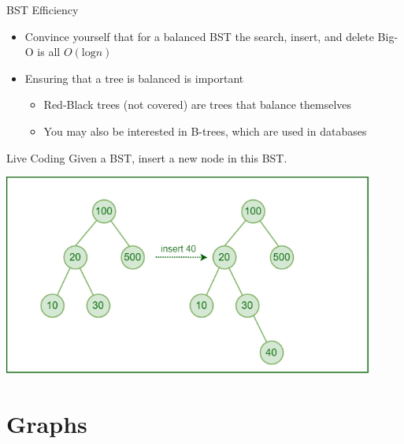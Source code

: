 \documentclass[
  ignorenonframetext,
]{beamer}
\begin{document}
\begin{frame}{BST Efficiency}
\protect\hypertarget{bst-efficiency-1}{}
\begin{itemize}
\item
  Convince yourself that for a balanced BST the search, insert, and
  delete Big-O is all \(O(\text{log}n)\)
\item
  Ensuring that a tree is balanced is important

  \begin{itemize}
  \item
    Red-Black trees (not covered) are trees that balance themselves
  \item
    You may also be interested in B-trees, which are used in databases
  \end{itemize}
\end{itemize}
\end{frame}

\begin{frame}{Live Coding}
\protect\hypertarget{live-coding}{}
Given a BST, insert a new node in this BST.

\includegraphics[width=4.80208in,height=\textheight]{images/insertion.png}
\end{frame}

\hypertarget{graphs}{%
\section{Graphs}\label{graphs}}
\end{document}
